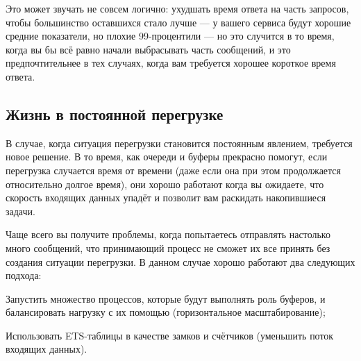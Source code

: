 \documentclass[11pt, oneside]{book}   	%
\begin{document}
Это может звучать не совсем логично: ухудшать время ответа на часть запросов, чтобы большинство оставшихся стало лучше --- у вашего сервиса будут хорошие средние показатели, но плохие 99-процентили --- но это случится в то время, когда вы бы всё равно начали выбрасывать часть сообщений, и это предпочтительнее в тех случаях, когда вам требуется хорошее короткое время ответа.


\subsection{Жизнь в постоянной перегрузке}

В случае, когда ситуация перегрузки становится постоянным явлением, требуется новое решение. В то время, как очереди и буферы прекрасно помогут, если перегрузка случается время от времени (даже если она при этом продолжается относительно долгое время), они хорошо работают когда вы ожидаете, что скорость входящих данных упадёт и позволит вам раскидать накопившиеся задачи.

Чаще всего вы получите проблемы, когда попытаетесь отправлять настолько много сообщений, что принимающий процесс не сможет их все принять без создания ситуации перегрузки. В данном случае хорошо работают два следующих подхода:

\begin{itemize*}
	\item Запустить множество процессов, которые будут выполнять роль буферов, и балансировать нагрузку с их помощью (горизонтальное масштабирование);
	\item Использовать ETS-таблицы в качестве замков и счётчиков (уменьшить поток входящих данных).
\end{itemize*}
\end{document}
